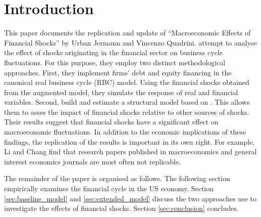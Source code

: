 \section{Introduction}
\label{sec:introduction}

This paper documents the replication and update of “Macroeconomic Effects of Financial Shocks” by Urban Jermann and Vincenzo Quadrini. \citeauthor{JERMANNfinancial} attempt to analyse the effect of shocks originating in the financial sector on business cycle fluctuations. For this purpose, they employ two distinct methodological approaches. First, they implement firms' debt and equity financing in the canonical real business cycle (RBC) model. Using the financial shocks obtained from the augmented model, they simulate the response of real and financial variables. Second, \citeauthor{JERMANNfinancial} build and estimate a structural model based on \citet{SMETSshocks}. This allows them to asses the impact of financial shocks relative to other sources of shocks. Their results suggest that financial shocks have a significant effect on macroeconomic fluctuations. In addition to the economic implications of these findings, the replication of the results is important in its own right. For example, Li and Chang find that research papers published in macroeconomics and general interest economics journals are most often not replicable. 

The remainder of the paper is organised as follows. The following section empirically examines the financial cycle in the US economy. Section \ref{sec:baseline_model} and \ref{sec:extended_model} discuss the two approaches \citeauthor{JERMANNfinancial} use to investigate the effects of financial shocks. Section \ref{sec:conclusion} concludes.


